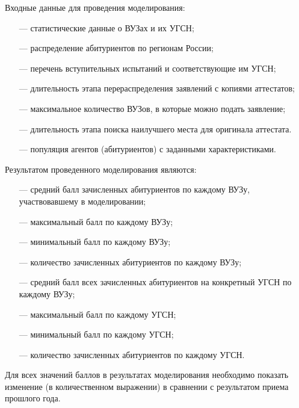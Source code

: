 Входные данные для проведения моделирования:

\begin{itemize}[leftmargin=1.6\parindent]
	\item[---] статистические данные о ВУЗах и их УГСН;
	\item[---] распределение абитуриентов по регионам России;
	\item[---] перечень вступительных испытаний и соответствующие им УГСН;
	\item[---] длительность этапа перераспределения заявлений с копиями аттестатов;
	\item[---] максимальное количество ВУЗов, в которые можно подать заявление;
	\item[---] длительность этапа поиска наилучшего места для оригинала аттестата.
	\item[---] популяция агентов (абитуриентов) с заданными характеристиками.

\end{itemize}

Результатом проведенного моделирования являются:

\begin{itemize}[leftmargin=1.6\parindent]
	\item[---] средний балл зачисленных абитуриентов по каждому ВУЗу, участвовавшему в моделировании;
	\item[---] максимальный балл по каждому ВУЗу;
	\item[---] минимальный балл по каждому ВУЗу;
	\item[---] количество зачисленных абитуриентов по каждому ВУЗу;
	\item[---] средний балл всех зачисленных абитуриентов на конкретный УГСН по каждому ВУЗу;
	\item[---] максимальный балл по каждому УГСН;
	\item[---] минимальный балл по каждому УГСН;
	\item[---] количество зачисленных абитуриентов по каждому УГСН.

\end{itemize}

Для всех значений баллов в результатах моделирования необходимо показать изменение (в количественном выражении) в сравнении с результатом приема прошлого года.















\pagebreak